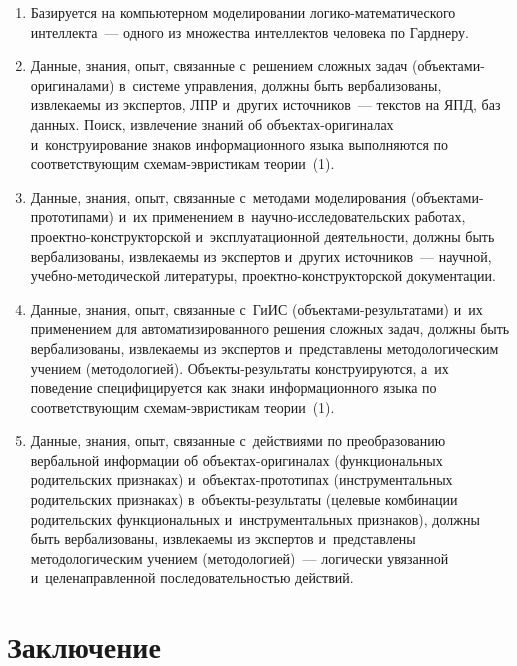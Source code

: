 \begin{multicols}{2}
\noindent
\begin{enumerate}[1.]
\item Базируется на компьютерном моделировании ло\-ги\-ко-математического интеллекта~--- 
одного из множества интеллектов человека по Гард\-неру.
\item Данные, знания, опыт, связанные с~решением сложных задач  
(объ\-ек\-та\-ми-ори\-ги\-на\-ла\-ми) в~систе\-ме управ\-ле\-ния, должны быть 
вербализованы, извлекаемы из экспертов, ЛПР и~других источников~--- текстов на ЯПД, баз 
данных. Поиск, извлечение знаний об объ\-ек\-тах-ори\-ги\-на\-лах и~конструирование знаков 
информационного языка выполняются по соответствующим схе\-мам-эври\-сти\-кам 
теории~(1).
\item Данные, знания, опыт, связанные с~методами моделирования  
(объ\-ек\-та\-ми-про\-то\-ти\-па\-ми) и~их применением 
в~на\-уч\-но-ис\-сле\-до\-ва\-тель\-ских работах,  
про\-ект\-но-кон\-ст\-рук\-тор\-ской и~эксплуатационной деятельности, должны быть 
вербализованы, извлекаемы из экспертов и~других источников~--- научной,  
учеб\-но-ме\-то\-ди\-че\-ской литературы, про\-ект\-но-кон\-ст\-рук\-тор\-ской документации. 
\item  Данные, знания, опыт, связанные с~ГиИС (объ\-ек\-та\-ми-ре\-зуль\-та\-та\-ми) и~их 
применением для автоматизированного решения сложных задач, должны быть 
вербализованы, извлекаемы из экспертов и~представлены методологическим учением 
(методологией). Объ\-ек\-ты-ре\-зуль\-та\-ты конструируются, а~их поведение специфицируется как 
знаки информационного языка по соответствующим схе\-мам-эври\-сти\-кам теории~(1). 
\item Данные, знания, опыт, связанные с~действиями по преобразованию вербальной 
информации об объ\-ек\-тах-ори\-ги\-на\-лах (функциональных %
 родительских признаках) 
и~объ\-ек\-тах-прото\-типах (инструментальных родительских %
при\-знаках)  
в~объ\-ек\-ты-ре\-зуль\-та\-ты (целевые комбинации 
родительских функциональных 
и~инструментальных признаков), должны быть вербализованы, извлекаемы из экспертов 
и~представлены методологическим учением (методологией)~--- ло\-ги\-че\-ски увя\-зан\-ной 
и~це\-ле\-на\-прав\-лен\-ной последовательностью действий.
\end{enumerate}



\section{Заключение}




\end{multicols}
